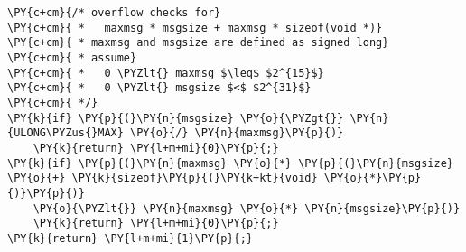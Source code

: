 \begin{Verbatim}[commandchars=\\\{\},codes={\catcode`\$=3\catcode`\^=7\catcode`\_=8}]
\PY{c+cm}{/* overflow checks for}
\PY{c+cm}{ *   maxmsg * msgsize + maxmsg * sizeof(void *)}
\PY{c+cm}{ * maxmsg and msgsize are defined as signed long}
\PY{c+cm}{ * assume}
\PY{c+cm}{ *   0 \PYZlt{} maxmsg $\leq$ $2^{15}$}
\PY{c+cm}{ *   0 \PYZlt{} msgsize $<$ $2^{31}$}
\PY{c+cm}{ */}
\PY{k}{if} \PY{p}{(}\PY{n}{msgsize} \PY{o}{\PYZgt{}} \PY{n}{ULONG\PYZus{}MAX} \PY{o}{/} \PY{n}{maxmsg}\PY{p}{)}
    \PY{k}{return} \PY{l+m+mi}{0}\PY{p}{;}
\PY{k}{if} \PY{p}{(}\PY{n}{maxmsg} \PY{o}{*} \PY{p}{(}\PY{n}{msgsize} \PY{o}{+} \PY{k}{sizeof}\PY{p}{(}\PY{k+kt}{void} \PY{o}{*}\PY{p}{)}\PY{p}{)}
    \PY{o}{\PYZlt{}} \PY{n}{maxmsg} \PY{o}{*} \PY{n}{msgsize}\PY{p}{)}
    \PY{k}{return} \PY{l+m+mi}{0}\PY{p}{;}
\PY{k}{return} \PY{l+m+mi}{1}\PY{p}{;}
\end{Verbatim}
